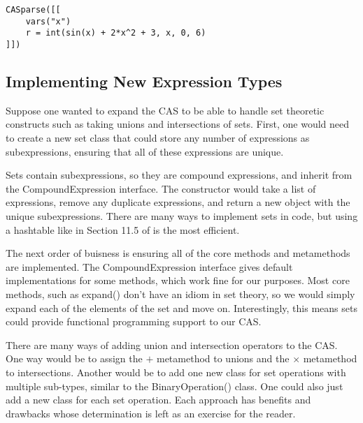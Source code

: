 \documentclass{article}
\begin{document}
\begin{verbatim}
CASparse([[
    vars("x")
    r = int(sin(x) + 2*x^2 + 3, x, 0, 6)
]])
\end{verbatim}

\subsection{Implementing New Expression Types}

Suppose one wanted to expand the CAS to be able to handle set theoretic constructs such as taking unions and intersections of sets. First, one would need to create a new set class that could store any number of expressions as subexpressions, ensuring that all of these expressions are unique.

Sets contain subexpressions, so they are compound expressions, and inherit from the {\ttfamily CompoundExpression} interface. The constructor would take a list of expressions, remove any duplicate expressions, and return a new object with the unique subexpressions. There are many ways to implement sets in code, but using a hashtable like in Section 11.5 of \cite{pil} is the most efficient.

The next order of buisness is ensuring all of the core methods and metamethods are implemented. The {\ttfamily CompoundExpression} interface gives default implementations for some methods, which work fine for our purposes. Most core methods, such as {\ttfamily expand()} don't have an idiom in set theory, so we would simply expand each of the elements of the set and move on. Interestingly, this means sets could provide functional programming support to our CAS.

There are many ways of adding union and intersection operators to the CAS. One way would be to assign the $+$ metamethod to unions and the $\times$ metamethod to intersections. Another would be to add one new class for set operations with multiple sub-types, similar to the {\ttfamily BinaryOperation()} class. One could also just add a new class for each set operation. Each approach has benefits and drawbacks whose determination is left as an exercise for the reader.
\end{document}
